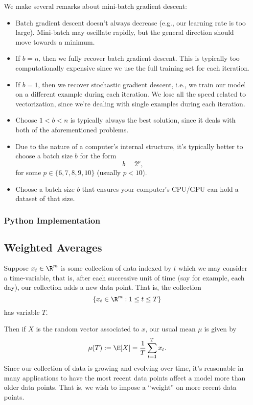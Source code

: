 We make several remarks about mini-batch gradient descent:
\begin{itemize}
	\item Batch gradient descent doesn't always decrease (e.g., our learning rate is too large).  Mini-batch may oscillate rapidly, but the general direction should move towards a minimum.
	\item If $b=n$, then we fully recover batch gradient descent.  This is typically too computationally expensive since we use the full training set for each iteration.
	\item If $b=1$, then we recover stochastic gradient descent, i.e., we train our model on a different example during each iteration.  We lose all the speed related to vectorization, since we're dealing with single examples during each iteration.
	\item Choose $1<b<n$ is typically always the best solution, since it deals with both of the aforementioned problems.
	\item Due to the nature of a computer's internal structure, it's typically better to choose a batch size $b$ for the form
		$$b=2^p,$$
		for some $p\in\{6,7,8,9,10\}$ (usually $p<10$).
	\item Choose a batch size $b$ that ensures your computer's CPU/GPU can hold a dataset of that size.
\end{itemize}


\subsubsection{Python Implementation}





\subsection{Weighted Averages}

Suppose $x_t\in\R^m$ is some collection of data indexed by $t$ which we may consider a time-variable, that is, after each successive unit of time (say for example, each day), our collection adds a new data point.  That is, the collection
$$\{x_t\in\R^m:1\leq t\leq T\}$$
has variable $T$.  

Then if $X$ is the random vector associated to $x$, our usual mean $\mu$ is given by
$$\mu(T):=\E[X]=\frac{1}{T}\sum_{t=1}^Tx_t.$$
Since our collection of data is growing and evolving over time, it's reasonable in many applications to have the most recent data points affect a model more than older data points.  That is, we wish to impose a ``weight'' on more recent data points.

